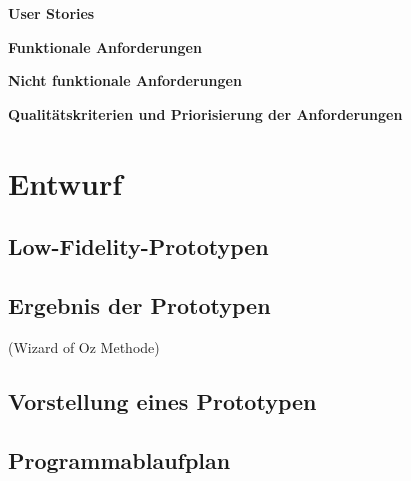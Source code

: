 





%

\textbf{User Stories}

\textbf{Funktionale Anforderungen}

\textbf{Nicht funktionale Anforderungen}

\textbf{Qualitätskriterien und Priorisierung der Anforderungen}

\section{Entwurf}

\subsection{Low-Fidelity-Prototypen}

\subsection{Ergebnis der Prototypen}
(Wizard of Oz Methode)

\subsection{Vorstellung eines Prototypen}

\subsection{Programmablaufplan}

